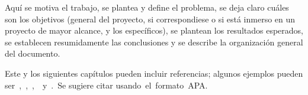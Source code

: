 Aquí se motiva el trabajo, se plantea y define el problema, se deja claro cuáles son los objetivos (general del proyecto, si correspondiese o si está inmerso en un proyecto de mayor alcance, y los específicos), se plantean los resultados esperados, se establecen resumidamente las conclusiones y se describe la organización general del documento.

Este y los siguientes capítulos pueden incluir referencias; algunos ejemplos pueden ser~\cite{CitekeyArticle},~\cite{CitekeyBook},~\cite{CitekeyInproceedings},~\cite{CitekeyManual}~y~\cite{CitekeyMisc}.\@~Se sugiere citar usando~el~formato~APA.\@
